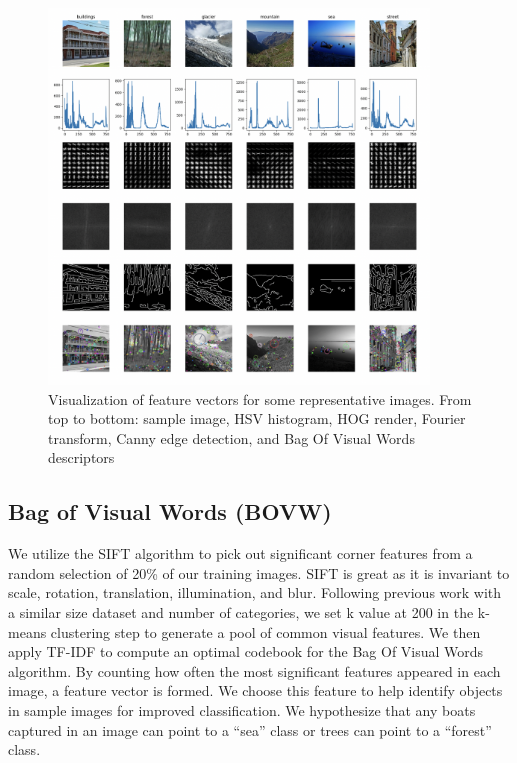 \documentclass[11pt]{article}
\begin{document}
\begin{figure}[h!]
\centering
\includegraphics[width=0.9\textwidth]{features.png}
\caption{Visualization of feature vectors for some representative images. From top to bottom: sample image, HSV histogram, HOG render, Fourier transform, Canny edge detection, and Bag Of Visual Words descriptors
}
\label{fig:features}
\end{figure}

\subsection{Bag of Visual Words (BOVW)}
We utilize the SIFT algorithm\cite{Lowe1999} to pick out significant corner features from a random selection of 20\% of our training images. SIFT is great as it is invariant to scale, rotation, translation, illumination, and blur. Following previous work with a similar size dataset and number of categories, we set k value at 200 in the k-means clustering step to generate a pool of common visual features. We then apply TF-IDF to compute an optimal codebook for the Bag Of Visual Words algorithm\cite{GidarisEtAl2020}. By counting how often the most significant features appeared in each image, a feature vector is formed. We choose this feature to help identify objects in sample images for improved classification. We hypothesize that any boats captured in an image can point to a “sea” class or trees can point to a “forest” class.
\end{document}
